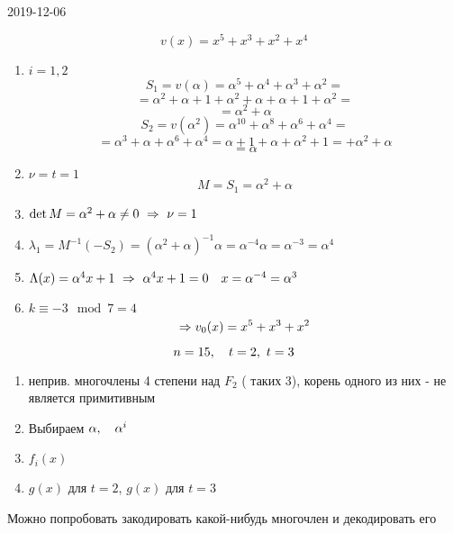 \documentclass[12pt, fleqn]{article}
\begin{document}
\begin{lect}{2019-12-06}
\begin{Example}
        \[v(x) = x^5 + x^3 + x^2 + x^4\]
        \begin{enumerate}
            \item $i = 1, 2$
                \[S_1 = v(\alpha) = \alpha^5 + \alpha^4 + \alpha^3 + \alpha^2 = \]
                \[ = \alpha^2 + \alpha + 1 + \alpha^2 + \alpha + \alpha + 1 + \alpha^2 = \]
                \[ = \alpha^2  + \alpha\]
                \[S_2 = v(\alpha^2) = \alpha^{10} + \alpha^8  +\alpha^6 + \alpha^4 =  \]
                \[ = \alpha^3 + \alpha + \alpha^6 + \alpha^4 = \alpha + 1 + \alpha + \alpha^2 + 1 = 
                + \alpha^2 + \alpha\]
                \[= \alpha \]
            \item $\nu = t = 1$
                \[M = S_1 = \alpha^2 + \alpha\]
            \item $\det M = \alpha^2 + \alpha \neq 0 \ \Ra \ \nu = 1$
            \item $\lambda_1 = M^{-1}(-S_2) = (\alpha^2 + \alpha)^{-1}\alpha = \alpha^{-4}\alpha = \alpha^{-3} 
                =\alpha^4$
            \item $\Lambda(x) = \alpha^4 x + 1 \ \Ra \ \alpha^4 x + 1 = 0 \q x = \alpha^{-4} = \alpha^3 $
            \item $k \equiv -3 \mod 7 = 4$
                \[\Rightarrow v_0(x) = x^5 + x^3 + x^2\]
        \end{enumerate}
    \end{Example}

    \begin{Task}[дз]
        \[n = 15, \quad t =  2, \ t = 3 \]
        \begin{enumerate}
            \item неприв. многочлены 4 степени над $F_2$ ( таких 3), корень одного из них - 
                не является примитивным
            \item Выбираем $\alpha, \quad \alpha^i$
            \item $f_i(x)$
            \item $g(x) $ для $t = 2$, \q $g(x)$ для $t = 3$
        \end{enumerate}
        Можно попробовать закодировать какой-нибудь многочлен и декодировать его
    \end{Task}
\end{lect}
\end{document}
